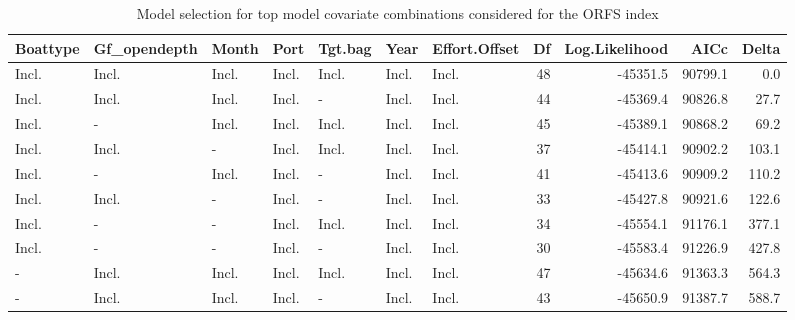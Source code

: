 \documentclass[
]{scrartcl}
\begin{document}
\begin{longtable}{lllllllrrrr}

\caption{\label{tbl-yelloweye_model_selection_ORBS}Model selection for
top model covariate combinations considered for the ORFS index}

\tabularnewline

\toprule
Boattype & Gf\_opendepth & Month & Port & Tgt.bag & Year & Effort.Offset & Df & Log.Likelihood & AICc & Delta \\ 
\midrule\addlinespace[2.5pt]
Incl. & Incl. & Incl. & Incl. & Incl. & Incl. & Incl. & 48 & -45351.5 & 90799.1 & 0.0 \\ 
Incl. & Incl. & Incl. & Incl. & - & Incl. & Incl. & 44 & -45369.4 & 90826.8 & 27.7 \\ 
Incl. & - & Incl. & Incl. & Incl. & Incl. & Incl. & 45 & -45389.1 & 90868.2 & 69.2 \\ 
Incl. & Incl. & - & Incl. & Incl. & Incl. & Incl. & 37 & -45414.1 & 90902.2 & 103.1 \\ 
Incl. & - & Incl. & Incl. & - & Incl. & Incl. & 41 & -45413.6 & 90909.2 & 110.2 \\ 
Incl. & Incl. & - & Incl. & - & Incl. & Incl. & 33 & -45427.8 & 90921.6 & 122.6 \\ 
Incl. & - & - & Incl. & Incl. & Incl. & Incl. & 34 & -45554.1 & 91176.1 & 377.1 \\ 
Incl. & - & - & Incl. & - & Incl. & Incl. & 30 & -45583.4 & 91226.9 & 427.8 \\ 
- & Incl. & Incl. & Incl. & Incl. & Incl. & Incl. & 47 & -45634.6 & 91363.3 & 564.3 \\ 
- & Incl. & Incl. & Incl. & - & Incl. & Incl. & 43 & -45650.9 & 91387.7 & 588.7 \\ 
\bottomrule

\end{longtable}

\endgroup

\newpage{}

\begingroup
\fontsize{9.0pt}{10.8pt}\selectfont
\end{document}
